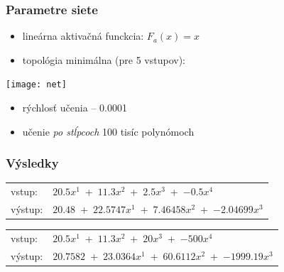 \documentclass[red]{beamer}
\newcommand*\arc{{\fontfamily{pbk}\fontseries{db}\selectfont+}}
\begin{document}
\begin{frame}
\frametitle{Parametre siete}
\begin{center}
\begin{itemize}
\item lineárna aktivačná funckcia: $F_a(x)=x$
\item topológia minimálna (pre 5 vstupov):
\end{itemize}

\vspace*{0.5cm}
\texttt{[image: net]}

\begin{itemize}
\item rýchlosť učenia -- 0.0001
\item učenie \textit{po stĺpcoch} 100 tisíc polynómoch
\end{itemize}
\end{center} 
\end{frame}

\begin{frame}
\frametitle{Výsledky}

\vspace*{0.5cm}

\begin{tabular}{ l l }
		vstup: & $20.5x^1$~\arc~$11.3x^2$~\arc~$2.5x^3$~\arc~$-0.5x^4$\\
		výstup: & $20.48$~\arc~$22.5747x^1$~\arc~$7.46458x^2$~\arc~$-2.04699x^3$
\end{tabular}

\vspace*{1cm}

\begin{tabular}{ l l }
		vstup: & $20.5x^1$~\arc~$11.3x^2$~\arc~$20x^3$~\arc~$-500x^4$\\
		výstup: & $20.7582$~\arc~$23.0364x^1$~\arc~$60.6112x^2$~\arc~$-1999.19x^3$
\end{tabular}

\end{frame}
\end{document}
